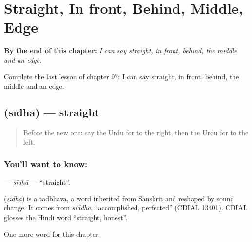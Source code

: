 
\chapter{Straight, In front, Behind, Middle, Edge}
\label{ch:ur-straight-in-front-behind-middle-edge}

\begin{chapteropening}
\textbf{By the end of this chapter:} \emph{I can say straight, in front, behind, the middle and an edge.}

Complete the last lesson of chapter 97: I can say straight, in front, behind, the middle and an edge.
\end{chapteropening}

\section[\texorpdfstring{\ur{سیدھا} (sīdhā)}{سیدھا (sīdhā)}]{ (sīdhā) — straight}

\label{lesson:UR-C97-sidha}



\begin{quote}
Before the new one: say the Urdu for to the right, then the Urdu for to the left.
\end{quote}

\subsection*{You'll want to know: }
\textbf{} — \emph{sīdhā} — \textquotedblleft{}straight\textquotedblright{}.

\begin{cousinweb}
\textbf{} (\emph{sīdhā}) is a tadbhava, a word inherited from Sanskrit and reshaped by sound change. It comes from \emph{siddha}, \textquotedblleft{}accomplished, perfected\textquotedblright{} (CDIAL 13401). CDIAL glosses the Hindi word \textquotedblleft{}straight, honest\textquotedblright{}.
\end{cousinweb}

\begin{grammarlens}[title={What you've built}]
One more word for this chapter.
\end{grammarlens}

